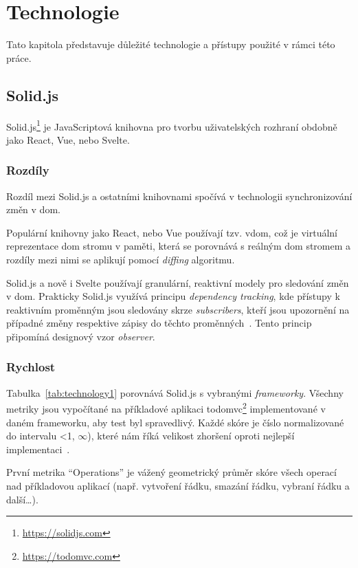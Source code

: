 \chapter{Technologie}

Tato kapitola představuje důležité technologie a přístupy použité v rámci této práce.

\section{Solid.js}

Solid.js\footnote{\url{https://solidjs.com}} je JavaScriptová knihovna pro tvorbu uživatelských rozhraní obdobně jako React, Vue, nebo Svelte.


\subsection{Rozdíly}

Rozdíl mezi Solid.js a ostatními knihovnami spočívá v technologii synchronizování změn v \gls{dom}.

Populární knihovny jako React, nebo Vue používají tzv. \gls{vdom}, což je virtuální reprezentace \gls{dom} stromu v paměti, která se porovnává s reálným \gls{dom} stromem a rozdíly mezi nimi se aplikují pomocí \textit{diffing} algoritmu.

Solid.js a nově i Svelte používají granulární, reaktivní modely pro sledování změn v \gls{dom}.
Prakticky Solid.js využívá principu \textit{dependency tracking}, kde přístupy k reaktivním proměnným jsou sledovány skrze \textit{subscribers}, kteří jsou upozornění na případné změny respektive zápisy do těchto proměnných~\cite{solid-reactivity}.
Tento princip připomíná designový vzor \textit{observer}.

\subsection{Rychlost}

Tabulka~\ref{tab:technology1} porovnává Solid.js s vybranými \textit{frameworky}.
Všechny metriky jsou vypočítané na příkladové aplikaci \gls{todomvc}\footnote{\url{https://todomvc.com}} implementované v daném frameworku, aby test byl spravedlivý.
Každé skóre je číslo normalizované do intervalu <1, $\infty$), které nám říká velikost zhoršení oproti nejlepší implementaci~\cite{krausest120,krausest122}.

První metrika ``Operations'' je vážený geometrický průměr skóre všech operací nad příkladovou aplikací (např. vytvoření řádku, smazání řádku, vybraní řádku a další\dots).

